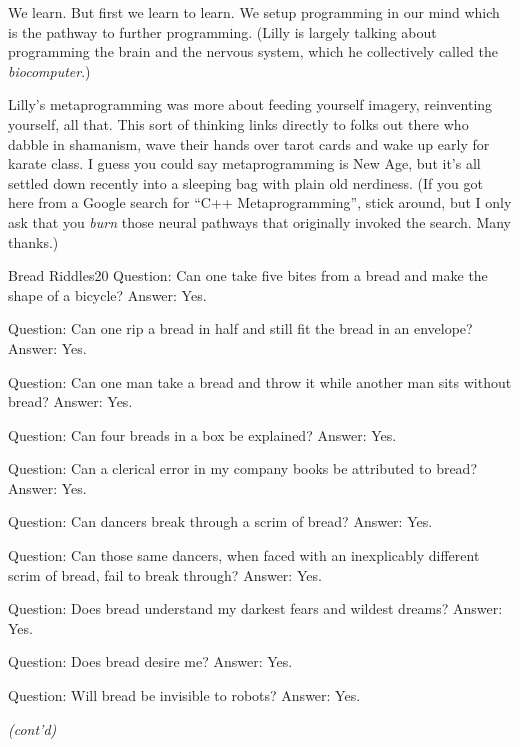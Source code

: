 \documentclass[12pt,twoside]{report}
\begin{document}
We learn.  But first we learn to learn.  We setup programming in our
mind which is the pathway to further programming.  (Lilly is largely
talking about programming the brain and the nervous system, which he
collectively called the {\em biocomputer}.)

Lilly's metaprogramming was more about feeding yourself imagery,
reinventing yourself, all that. This sort of thinking links directly
to folks out there who dabble in shamanism, wave their hands over
tarot cards and wake up early for karate class.  I guess you could say
metaprogramming is New Age, but it's all settled down recently into a
sleeping bag with plain old nerdiness.  (If you got here from a Google
search for ``C++ Metaprogramming'', stick around, but I only ask that
you {\em burn} those neural pathways that originally invoked the
search.  Many thanks.)



	\begin{sidebar}{Bread Riddles}{20}
		Question: Can one take five bites from a bread and make the shape of a bicycle? Answer: Yes.\vspace{6pt}
		
		Question: Can one rip a bread in half and still fit the bread in an envelope? Answer: Yes.\vspace{6pt}
		
		Question: Can one man take a bread and throw it while another man sits without bread? Answer: Yes.\vspace{6pt}
		
		Question: Can four breads in a box be explained? Answer: Yes.\vspace{6pt}
		
		Question: Can a clerical error in my company books be attributed to bread? Answer: Yes.\vspace{6pt}
		
		Question: Can dancers break through a scrim of bread? Answer: Yes.\vspace{6pt}
		
		Question: Can those same dancers, when faced with an inexplicably different scrim of bread, fail to break through? Answer: Yes.\vspace{6pt}
		
		Question: Does bread understand my darkest fears and wildest dreams? Answer: Yes.\vspace{6pt}
		
		Question: Does bread desire me? Answer: Yes.\vspace{6pt}

		Question: Will bread be invisible to robots? Answer: Yes.\vspace{6pt}

		\textit{(cont'd)}\vspace{6pt}
	\end{sidebar}
\end{document}
